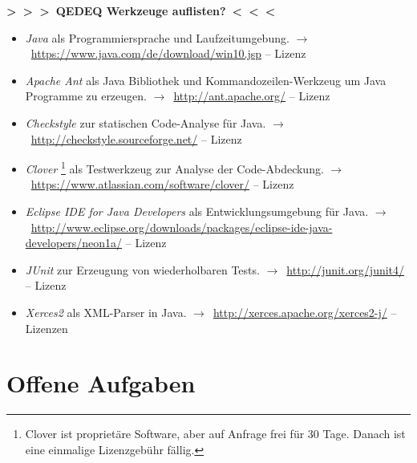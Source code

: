 \documentclass[english,ngerman,parskip=half,headsepline,footsepline,
	fleqn,notitlepage]{scrreprt}
\newcommand*{\texthead}[1]{\textnormal{\textsf{\textbf{#1}}}}%
\newcommand*{\Lohead}[1]{\lohead{\texthead{#1}}}
\newcommand*{\Cohead}[1]{\cohead{\texthead{#1}}}
\newcommand*{\Pagestyle}{\pagestyle{scrheadings}}
\newcommand*{\beginsection}[1]{%
	\Cohead{#1}%
	\Lohead{\sectionname~\thesection}%
	\Pagestyle%
}
\newcounter{Enumi}%
\newcommand*{\tourl}[1]{$\rightarrow$~\url{#1}}
\newcommand*{\todo}[1]{\textbf{>~>~>~#1~<~<~<}}%
\newcommand*{\sectionname}{Abschnitt}
\begin{document}
\todo{QEDEQ Werkzeuge auflisten?}%

	\begin{itemize}
		\setcounter{enumi}{\value{Enumi}}%

		\item\label{Werkzeug:Java}\emph{Java}
		als Programmiersprache und Laufzeitumgebung.
		\tourl{https://www.java.com/de/download/win10.jsp}
		-- Lizenz \seename~\cite{bib:JavaSE}

		\item\label{Werkzeug:Apache Ant}\emph{Apache Ant}
		als Java Bibliothek und Kommandozeilen-Werkzeug
		um Java Programme zu erzeugen.
		\tourl{http://ant.apache.org/}
		-- Lizenz \seename~\cite{bib:Apacheii}

		\item\label{Werkzeug:Checkstyle}\emph{Checkstyle}
		zur statischen Code-Analyse für Java.
		\tourl{http://checkstyle.sourceforge.net/}
		-- Lizenz \seename~\cite{bib:LGPLii}

		\item\label{Werkzeug:Clover}\emph{Clover}%
		\footnote{%
			Clover ist proprietäre Software, aber auf Anfrage frei für 30 Tage.
			Danach ist eine einmalige Lizenzgebühr fällig.%
		}
		als Testwerkzeug zur Analyse der Code-Abdeckung.
		\tourl{https://www.atlassian.com/software/clover/}
		-- Lizenz \seename~\cite{bib:Clover}

		\item\label{Werkzeug:Eclipse Java}\emph{Eclipse IDE for Java Developers}
		als Entwicklungsumgebung für Java.
		\tourl{http://www.eclipse.org/downloads/packages/eclipse-ide-java-developers/neon1a/}
		-- Lizenz \seename~\cite{bib:OSI}

		\item\label{Werkzeug:JUnit}\emph{JUnit}
		zur Erzeugung von wiederholbaren Tests.
		\tourl{http://junit.org/junit4/}
		-- Lizenz \seename~\cite{bib:EPL}

		\item\label{Werkzeug:Xerces2}\emph{Xerces2} als XML-Parser in Java.
		\tourl{http://xerces.apache.org/xerces2-j/}
		-- Lizenzen \seename~\cite{bib:Apacheii, bib:SAX, bib:WDCDL, bib:WDCSNL}

		\setcounter{Enumi}{\value{enumi}}%
	\end{itemize}

	\section{Offene Aufgaben}%
	\beginsection{Offene Aufgaben}
	\label{sec:Offene Aufgaben}
\end{document}
